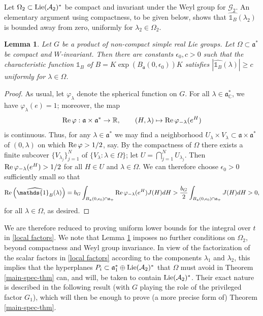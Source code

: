 \documentclass[12pt]{amsart}
\newtheorem{lemma}[theorem]{Lemma}
\theoremstyle{remark}
\newcommand{\R}{\mathbb R}
\newcommand{\C}{\mathbb C}
\newcommand{\ga}{\mathfrak a}
\begin{document}
Let $\Omega_2\subset {\rm Lie}(\mathcal{A}_2)^*$ be compact and invariant under the Weyl group for $\mathcal{G}_2$. An elementary argument using compactness, to be given below, shows that $\widehat{\mathds{1}_B}(\lambda_2)$ is bounded away from zero, uniformly for $\lambda_2\in\Omega_2$. 

\begin{lemma}\label{lemma:ball}
Let $G$ be a product of non-compact simple real Lie groups. Let $\Omega\subset\ga^*$ be compact and $W$-invariant. Then there are constants $\epsilon_0,c>0$ such that the characteristic function $\mathds{1}_B$ of $B=K\exp(B_\ga(0,\epsilon_0))K$ satisfies $|\widehat{\mathds{1}_B}(\lambda)|\geq c$ uniformly for $\lambda\in\Omega$. 
\end{lemma}

\begin{proof}
As usual, let $\varphi_\lambda$ denote the spherical function on $G$. For all $\lambda\in\ga^*_{\C}$, we have $\varphi_\lambda(e)=1$; moreover, the map
\[
{\rm Re}\,\varphi: \ga\times \ga^*\rightarrow \R,\qquad (H,\lambda)\mapsto {\rm Re}\,\varphi_{-\lambda}(e^H)
\]
is continuous. Thus, for any $\lambda\in\ga^*$ we may find a neighborhood $U_\lambda\times V_\lambda\subset \ga\times\ga^*$ of $(0,\lambda)$ on which ${\rm Re}\, \varphi>1/2$, say. By the compactness of $\Omega$ there exists a finite subcover $\{V_{\lambda_j}\}_{j=1}^N$ of $\{V_\lambda: \lambda\in\Omega\}$; let $U=\bigcap_{j=1}^NU_{\lambda_j}$. Then ${\rm Re}\,\varphi_{-\lambda}(e^H)> 1/2$ for all $H\in U$ and $\lambda\in\Omega$. We can therefore choose $\epsilon_0>0$ sufficiently small so that
\[
{\rm Re}\left(\widehat{\mathds{1}_B}(\lambda)\right) = b_G \int_{B_{\ga}(0,\epsilon_0) \cap \ga_+}  {\rm Re}\,\varphi_{-\lambda}(e^H) J(H)dH >\frac{ b_G}{2} \int_{B_{\ga}(0,\epsilon_0) \cap \ga_+}  J(H) dH > 0,
\]
for all $\lambda \in \Omega$, as desired.
\end{proof}

We are therefore reduced to proving uniform lower bounds for the integral over $t$ in \eqref{local factors}. We note that Lemma \ref{lemma:ball} imposes no further conditions on $\Omega_2$, beyond compactness and Weyl group invariance. In view of the factorization of the scalar factors in \eqref{local factors} according to the components $\lambda_1$ and $\lambda_2$, this implies that the hyperplanes $P_i\subset\ga_1^*\oplus {\rm Lie}(\mathcal{A}_2)^*$ that $\Omega$ must avoid in Theorem \ref{main-spec-thm} can, and will, be taken to contain ${\rm Lie}(\mathcal{A}_2)^*$. Their exact nature is described in the following result (with $G$ playing the role of the privileged factor $G_1$), which will then be enough to prove (a more precise form of) Theorem \ref{main-spec-thm}.
\end{document}
